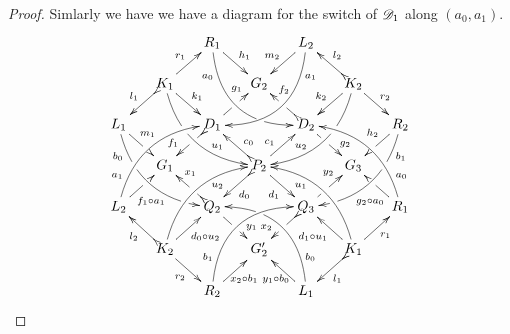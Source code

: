 \begin{proof}
		Simlarly we have we have a diagram for the switch of $\mathscr{D}_1$ along $(a_0, a_1)$.
		\[\xymatrix@C=15pt@R=15pt{&&R_1 \ar@/_.8cm/[ddrr]_(.2){a_0}|(.7)\hole
			\ar[dr]^{h_1}&& L_2\ar@/^.8cm/[ddll]^(.2){a_1}
			\ar[dl]_{m_2}\\&K_1\ar[dr]^{k_1}\ar@{>->}[dl]_{l_1}
			\ar@/_.6cm/[ddrr]|(.36)\hole^(.65){u_1}\ar[ur]^{r_1}&& G_2 &&
			K_2
			\ar@/^.6cm/[ddll]|(.36)\hole_(.65){u_2}\ar[dl]_{k_2}\ar@{>->}[lu]_{l_2}
			\ar[dr]^{r_2}\\L_1
			\ar@/_.6cm/[ddrr]_(.2){b_0}|(.31)\hole|(.81)\hole
			\ar[dr]^(.4){m_1}|(.61)\hole && D_1
			\ar@{>->}[dl]|(.4)\hole_(.65){f_1}\ar[ur]|(.5)\hole^(.7){g_1}&&D_2
			\ar[dr]|(.4)\hole^(.65){g_2}
			\ar@{>->}[ul]|(.5)\hole_(.65){f_2}&&R_2\ar@/^.6cm/[ddll]^(.2){b_1}|(.31)\hole|(.81)\hole\ar[dl]_(.4){h_2}|(.61)\hole\\&G_1
			&&P_2\ar[dr]_{d_1}
			\ar@{>->}[dl]^{d_0}\ar[ur]^(.4){c_1}\ar@{>->}[ul]_(.4){c_0}&&G_3\\L_2
			\ar@/^.6cm/[uurr]^(.2){a_1} \ar[ur]_(.35){f_1\circ
				a_1}|(.61)\hole&&Q_2
			\ar@{>->}[ul]|(.4)\hole_(.65){x_1}\ar[dr]|(.5)\hole^(.65){y_1}
			&&Q_3\ar[ur]|(.4)\hole^(.65){y_2} \ar@{>->}[dl]|(.5)\hole_(.65){x_2}
			&& R_1 \ar[ul]^(.3){g_2\circ
				a_0}|(.61)\hole\ar@/_.6cm/[uull]_(.2){a_0}\\&K_2
			\ar[ur]_{d_0\circ u_2} \ar[dr]_{r_2}
			\ar@{>->}[ul]^{l_2}\ar@/^.6cm/[uurr]_(.65){u_2}&&G'_2&& K_1
			\ar[ur]_{r_1} \ar[ul]^{d_1\circ u_1} \ar@{>->}[dl]^{l_1}
			\ar@/_.6cm/[uull]^(.65){u_1}\\&& R_2
			\ar[ur]_{\hspace{-6pt}x_2\circ
				b_1}\ar@/^.8cm/[uurr]^(.2){b_1}&& L_1 \ar[ul]^{y_1\circ
				b_0\hspace{-7pt}} \ar@/_.8cm/[uull]_(.2){b_0} |(.69)\hole
		}	\]
		

\end{proof}
